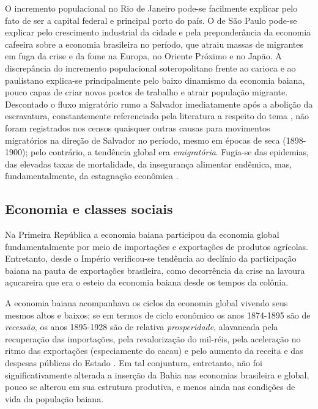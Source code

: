 O incremento populacional no Rio de Janeiro pode-se facilmente explicar pelo fato de ser a capital federal e principal porto do país. O de São Paulo pode-se explicar pelo crescimento industrial da cidade e pela preponderância da economia cafeeira sobre a economia brasileira no período, que atraiu massas de migrantes em fuga da crise e da fome na Europa, no Oriente Próximo e no Japão. A discrepância do incremento populacional soteropolitano frente ao carioca e ao paulistano explica-se principalmente pelo baixo dinamismo da economia baiana, pouco capaz de criar novos postos de trabalho e atrair população migrante. Descontado o fluxo migratório rumo a Salvador imediatamente após a abolição da escravatura, constantemente referenciado pela literatura a respeito do tema \cite{fraga_encruzilhadas_2014,souza_trabalholivre_2011}, não foram registrados nos censos quaisquer outras causas para movimentos migratórios na direção de Salvador no período, mesmo em épocas de seca (1898-1900); pelo contrário, a tendência global era \textit{emigratória}. Fugia-se das epidemias, das elevadas taxas de mortalidade, da insegurança alimentar endêmica, mas, fundamentalmente, da estagnação econômica \cite{santos_repovo_2001}.

\subsection{Economia e classes sociais}\label{subsubsec:ecobasa}

Na Primeira República a economia baiana participou da economia global fundamentalmente por meio de importações e exportações de produtos agrícolas. Entretanto, desde o Império verificou-se tendência ao declínio da participação baiana na pauta de exportações brasileira, como decorrência da crise na lavoura açucareira que era o esteio da economia baiana desde os tempos da colônia.

A economia baiana acompanhava os ciclos da economia global vivendo seus mesmos altos e baixos; se em termos de ciclo econômico os anos 1874-1895 são de \textit{recessão}, os anos 1895-1928 são de relativa \textit{prosperidade}, alavancada pela recuperação das importações, pela revalorização do mil-réis, pela aceleração no ritmo das exportações (especiamente do cacau) e pelo aumento da receita e das despesas públicas do Estado \cite[p.~28-29]{CPE1980}. Em tal conjuntura, entretanto, não foi significativamente alterada a inserção da Bahia nas economias brasileira e global, pouco se alterou em sua estrutura produtiva, e menos ainda nas condições de vida da população baiana.

